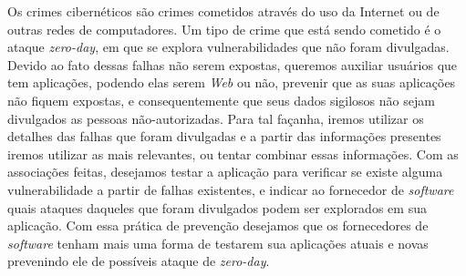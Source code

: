 \begin{resumo}
Os crimes cibernéticos são crimes cometidos através do uso da Internet ou de outras redes de computadores. Um tipo de crime que está 
sendo cometido é o ataque \textit{zero-day}, em que se explora vulnerabilidades que não foram divulgadas. Devido ao fato dessas falhas 
não serem expostas, queremos auxiliar usuários que tem aplicações, podendo elas serem \textit{Web} ou não, prevenir que as suas 
aplicações não fiquem expostas, e consequentemente que seus dados sigilosos não sejam divulgados as pessoas não-autorizadas. Para tal 
façanha, iremos utilizar os detalhes das falhas que foram divulgadas e a partir das informações presentes iremos utilizar as mais 
relevantes, ou tentar combinar essas informações. Com as associações feitas, desejamos testar a aplicação para verificar se existe 
alguma vulnerabilidade a partir de falhas existentes, e indicar ao fornecedor de \textit{software} quais ataques daqueles que foram 
divulgados podem ser explorados em sua aplicação. Com essa prática de prevenção desejamos que os fornecedores de \textit{software} tenham 
mais uma forma de testarem sua aplicações atuais e novas prevenindo ele de possíveis ataque de \textit{zero-day}.
\end{resumo}
